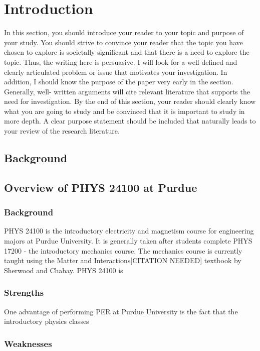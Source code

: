 \chapter[Chapter 1: Introduction]{Introduction}

In this section, you should introduce your reader to your topic and purpose of your study. You should strive to convince your reader that the topic you have chosen to explore is societally significant and that there is a need to explore the topic. Thus, the writing here is persuasive. I will look for a well-defined and clearly articulated problem or issue that motivates your investigation. In addition, I should know the purpose of the paper very early in the section. Generally, well- written arguments will cite relevant literature that supports the need for investigation. By the end of this section, your reader should clearly know what you are going to study and be convinced that it is important to study in more depth. A clear purpose statement should be included that naturally leads to your review of the research literature.

\section{Background}

\section{Overview of PHYS 24100 at Purdue}

\subsection{Background}

PHYS 24100 is the introductory electricity and magnetism course for engineering majors at Purdue University. It is generally taken after students complete PHYS 17200 - the introductory mechanics course. The mechanics course is currently taught using the Matter and Interactions[CITATION NEEDED] textbook by Sherwood and Chabay. PHYS 24100 is

\subsection{Strengths}

One advantage of performing PER at Purdue University is the fact that the introductory physics classes
\subsection{Weaknesses}

